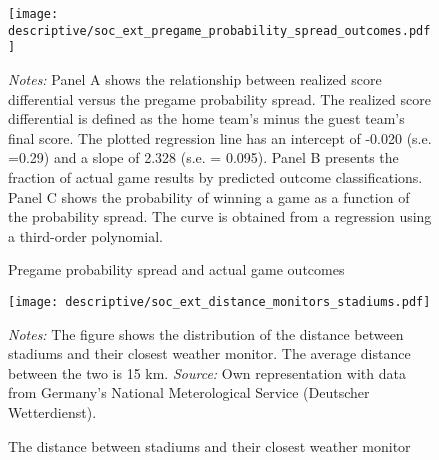 \vspace*{\fill}\clearpage
\vspace*{\fill}
\begin{figure}[H]\centering
	\texttt{[image: descriptive/soc\_ext\_pregame\_probability\_spread\_outcomes.pdf]}
	\scriptsize
	\begin{minipage}{\linewidth}
		\caption{Pregame probability spread and actual game outcomes}\label{fig_soc_ext:pregame_probability_spread_outcomes}
		\emph{Notes:} Panel A shows the relationship between realized score differential versus the pregame probability spread. The realized score differential is defined as the home team's minus the guest team's final score. The plotted regression line has an intercept of -0.020 (s.e. =0.29) and a slope of 2.328 (s.e. = 0.095). Panel B presents the fraction of actual game results by predicted outcome classifications. Panel C shows the probability of winning a game as a function of the probability spread. The curve is obtained from a regression using a third-order polynomial.
	\end{minipage}
\end{figure}
\vspace*{\fill}\clearpage

\vspace*{\fill}
\begin{figure}[H]\centering
	\texttt{[image: descriptive/soc\_ext\_distance\_monitors\_stadiums.pdf]}
	\begin{minipage}{0.95\linewidth}
		\caption{The distance between stadiums and their closest weather monitor}\label{fig_soc_ext:hist_distance_stadium_monitors}
		\scriptsize{\emph{Notes:} The figure shows the distribution of the distance between stadiums and their closest weather monitor. The average distance between the two is 15 km. \newline \emph{Source:} Own representation with data from Germany's National Meterological Service (Deutscher Wetterdienst).}
	\end{minipage}
\end{figure}
\vspace*{\fill}\clearpage


